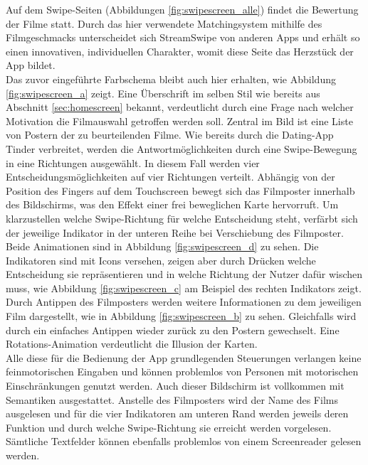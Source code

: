 Auf dem Swipe-Seiten (Abbildungen \ref{fig:swipescreen_alle}) findet die Bewertung der Filme statt. Durch das hier verwendete Matchingsystem mithilfe des Filmgeschmacks unterscheidet sich StreamSwipe von anderen Apps und erhält so einen innovativen, individuellen Charakter, womit diese Seite das Herzstück der App bildet.\\
Das zuvor eingeführte Farbschema bleibt auch hier erhalten, wie Abbildung \ref{fig:swipescreen_a} zeigt. Eine Überschrift im selben Stil wie bereits aus Abschnitt \ref{sec:homescreen} bekannt, verdeutlicht durch eine Frage nach welcher Motivation die Filmauswahl getroffen werden soll. Zentral im Bild ist eine Liste von Postern der zu beurteilenden Filme. Wie bereits durch die Dating-App Tinder verbreitet, werden die Antwortmöglichkeiten durch eine Swipe-Bewegung in eine Richtungen ausgewählt. In diesem Fall werden vier Entscheidungsmöglichkeiten auf vier Richtungen verteilt. Abhängig von der Position des Fingers auf dem Touchscreen bewegt sich das Filmposter innerhalb des Bildschirms, was den Effekt einer frei beweglichen Karte hervorruft. Um klarzustellen welche Swipe-Richtung für welche Entscheidung steht, verfärbt sich der jeweilige Indikator in der unteren Reihe bei Verschiebung des Filmposter. Beide Animationen sind in Abbildung \ref{fig:swipescreen_d} zu sehen. Die Indikatoren sind mit Icons versehen, zeigen aber durch Drücken welche Entscheidung sie repräsentieren und in welche Richtung der Nutzer dafür wischen  muss, wie Abbildung \ref{fig:swipescreen_c} am Beispiel des rechten Indikators zeigt. \\
Durch Antippen des Filmposters werden weitere Informationen zu dem jeweiligen Film dargestellt, wie in Abbildung \ref{fig:swipescreen_b} zu sehen. Gleichfalls wird durch ein einfaches Antippen wieder zurück  zu den Postern gewechselt. Eine Rotations-Animation verdeutlicht die Illusion der Karten.\\
Alle diese für die Bedienung der App grundlegenden Steuerungen verlangen keine feinmotorischen Eingaben und können problemlos von Personen mit motorischen Einschränkungen genutzt werden. Auch dieser Bildschirm ist vollkommen mit Semantiken ausgestattet. Anstelle des Filmposters wird der Name des Films ausgelesen und für die vier Indikatoren am unteren Rand werden jeweils deren Funktion und durch welche Swipe-Richtung sie erreicht werden vorgelesen. Sämtliche Textfelder können ebenfalls problemlos von einem Screenreader gelesen werden.




